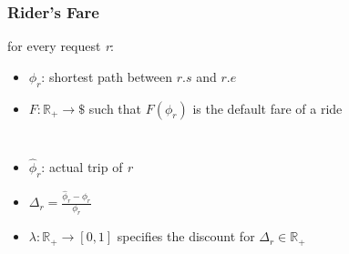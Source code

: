 \documentclass[t]{beamer}
\begin{document}
\begin{frame}\frametitle{Rider's Fare}
for every request \textit{r}:
\begin{itemize}
\item<1-> $\phi_r$: shortest path between $r.s$ and $r.e$
\item<2-> $F: \mathbb{R}_{+}  \rightarrow \$ $ such that $F(\phi_r)$ is the default fare of a ride
\end{itemize}
\begin{columns}
\begin{itemize}
\item<3-> $\hat{\phi}_r$: actual trip of \textit{r}
\item<3-> $\Delta_r = \frac{\hat{\phi}_r - \phi_r}{\phi_r}$
\item<4-> $\lambda: \mathbb{R}_{+} \rightarrow \left[ 0, 1 \right] $ specifies the discount for $\Delta_r \in \mathbb{R}_{+}$
\end{itemize}
\vspace{0.25in}

\end{columns}
\end{frame}
\end{document}
